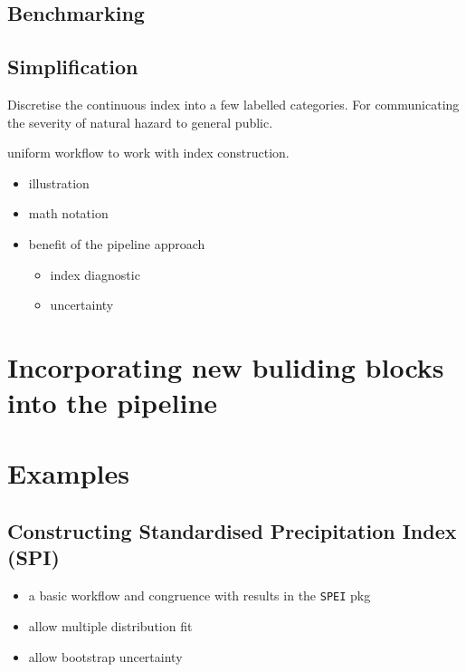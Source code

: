 \documentclass[
]{article}
\providecommand{\tightlist}{%
  \setlength{\itemsep}{0pt}\setlength{\parskip}{0pt}}\usepackage{longtable,booktabs,array}
\begin{document}
\hypertarget{benchmarking}{%
\subsection{Benchmarking}\label{benchmarking}}

\hypertarget{simplification}{%
\subsection{Simplification}\label{simplification}}

Discretise the continuous index into a few labelled categories. For
communicating the severity of natural hazard to general public.

uniform workflow to work with index construction.

\begin{itemize}
\tightlist
\item
  illustration
\item
  math notation
\item
  benefit of the pipeline approach

  \begin{itemize}
  \tightlist
  \item
    index diagnostic
  \item
    uncertainty
  \end{itemize}
\end{itemize}

\hypertarget{sec-incorporating-new-buliding-blocks-into-the-pipeline}{%
\section{Incorporating new buliding blocks into the
pipeline}\label{sec-incorporating-new-buliding-blocks-into-the-pipeline}}

\hypertarget{sec-examples}{%
\section{Examples}\label{sec-examples}}

\hypertarget{constructing-standardised-precipitation-index-spi}{%
\subsection{Constructing Standardised Precipitation Index
(SPI)}\label{constructing-standardised-precipitation-index-spi}}

\begin{itemize}
\tightlist
\item
  a basic workflow and congruence with results in the \texttt{SPEI} pkg
\item
  allow multiple distribution fit
\item
  allow bootstrap uncertainty
\end{itemize}
\end{document}
